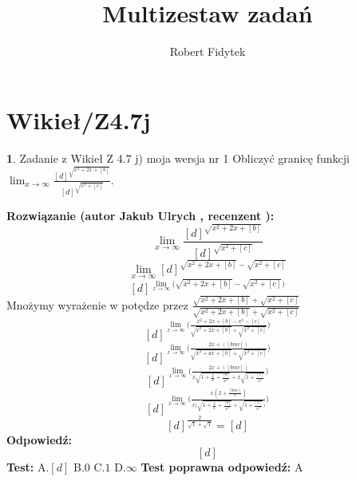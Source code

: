 \documentclass[12pt, a4paper]{article}
\title{Multizestaw zadań}
\author{Robert Fidytek}
\date{}
\theoremstyle{definition} %
\newtheorem{zad}{}
\newcommand{\kategoria}[1]{\section{#1}} %
\newcommand{\zadStart}[1]{\begin{zad}#1\newline} %
\newcommand{\zadStop}{\end{zad}}   %
\newcommand{\rozwStart}[2]{\noindent \textbf{Rozwiązanie (autor #1 , recenzent #2): }\newline} %
\newcommand{\rozwStop}{\newline}                                            %
\newcommand{\odpStart}{\noindent \textbf{Odpowiedź:}\newline}    %
\newcommand{\odpStop}{\newline}                                             %
\newcommand{\testStart}{\noindent \textbf{Test:}\newline} %
\newcommand{\testStop}{\newline} %
\newcommand{\kluczStart}{\noindent \textbf{Test poprawna odpowiedź:}\newline} %
\newcommand{\kluczStop}{\newline} %
\begin{document}
\maketitle


\kategoria{Wikieł/Z4.7j}
\zadStart{Zadanie z Wikieł Z 4.7 j) moja wersja nr 1}
Obliczyć granicę funkcji $\lim_{x \to \infty}\frac{[d]^{\sqrt{x^{2}+2x+[b]}}}{[d]^{\sqrt{x^{2}+[c]}}}$.
\zadStop
\rozwStart{Jakub Ulrych}{}
$$\lim_{x \to \infty}\frac{[d]^{\sqrt{x^{2}+2x+[b]}}}{[d]^{\sqrt{x^{2}+[c]}}}$$
$$\lim_{x \to \infty}[d]^{\sqrt{x^{2}+2x+[b]}-\sqrt{x^{2}+[c]}}$$
$$[d]^{\lim_{x \to \infty}\big(\sqrt{x^{2}+2x+[b]}-\sqrt{x^{2}+[c]}\big)}$$
Mnożymy wyrażenie w potędze przez $\frac{\sqrt{x^{2}+2x+[b]}+\sqrt{x^{2}+[c]}}{\sqrt{x^{2}+2x+[b]}+\sqrt{x^{2}+[c]}}$
$$[d]^{\lim_{x \to \infty}\big(\frac{x^{2}+2x+[b]-x^{2}-[c]}{\sqrt{x^{2}+2x+[b]}+\sqrt{x^{2}+[c]}}\big)}$$
$$[d]^{\lim_{x \to \infty}\big(\frac{2x+([bmc])}{\sqrt{x^{2}+ax+[b]}+\sqrt{x^{2}+[c]}}\big)}$$
$$[d]^{\lim_{x \to \infty}\bigg(\frac{2x+([bmc])}{x\sqrt{1+\frac{2}{x}+\frac{[b]}{x^{2}}}+x\sqrt{1+\frac{[c]}{x^{2}}}}\bigg)}$$
$$[d]^{\lim_{x \to \infty}\bigg(\frac{x(2+\frac{[bmc]}{x})}{x\big(\sqrt{1+\frac{2}{x}+\frac{[b]}{x^{2}}}+\sqrt{1+\frac{[c]}{x^{2}}}\big)}\bigg)}$$
$$[d]^{\frac{2}{\sqrt{1}+\sqrt{1}}}=[d]$$
\rozwStop
\odpStart
$$[d]$$
\odpStop
\testStart
A.$[d]$
B.$0$
C.$1$
D.$\infty$
\testStop
\kluczStart
A
\kluczStop
\end{document}
